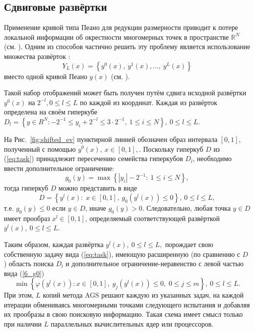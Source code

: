 \subsection{Сдвиговые развёртки}
\label{sec:shifted}

Применение кривой типа Пеано для редукции размерности приводит к потере локальной информации об окрестности многомерных точек
в пространстве $\mathbb{R}^N$ (см. \cite{Strongin1992}).
Одним из способов частично решить эту проблему является использование множества развёрток \cite{Strongin1992}:
\begin{equation}%
Y_L(x)=\left\{y^0(x),\ y^1(x),...,\ y^L(x)\right\}
\end{equation}
вместо одной кривой Пеано $y(x)$ (см. \cite{Strongin1992,Strongin2000, Strongin1991}).

Такой набор отображений может быть получен путём сдвига исходной развёртки $y^0(x)$ на $2^{-l},0
\leq l \leq L$ по каждой из координат. Каждая из развёрток определена на своём гиперкубе $D_l=
\left\{y \in R^N: -2^{-1} \leq y_i+2^{-l} \leq 3 \cdot 2^{-1},\ 1\leq i\leq N\right\},\ 0 \leq l \leq
L$.

На Рис.~\ref{fig:shifted_ev} пунктирной линией обозначен образ интервала $[0,1]$, полученный с помощью $y^0(x),\
x\in [0,1],$. Поскольку гиперкуб $D$ из (\ref{eq:task}) принадлежит пересечению
семейства гиперкубов $D_l$, необходимо ввести дополнительное ограничение:
\begin{equation}\label{6_g0}
g_0(y)=\max\left\{\left|y_i\right| - 2^{-1}:\ 1\leq i\leq N\right\},
\end{equation}
тогда гиперкуб $D$ можно представить в виде
\[
D=\left\{y^l(x):\; x\in [0,1],\ g_0(y^l(x))\leq 0 \right\},\ 0\leq l \leq L,
\]
т.е. $g_0(y) \leq 0$ если $y\in D$, иначе $g_0(y)>0$. Следовательно, любая точка $y \in D$
имеет прообраз $x^l \in [0,1]$, определяемый соответствующей развёрткой $y^l(x),\ 0\leq l\leq L$.

Таким образом, каждая развёртка $y^l(x),\ 0\leq l \leq L,$ порождает свою собственную задачу вида
(\ref{eq:task}), имеющую расширенную (по сравнению с $D$) область поиска $D_l$
и дополнительное ограничение-неравенство с левой частью вида (\ref{6_g0})
\begin{equation}\label{6_problem_l}
\min{\left\{\varphi(y^l(x)):x\in [0,1], \; g_j(y^l(x))\leq 0, \; 0 \leq j \leq m\right\}}, \ 0 \leq l \leq L.
\end{equation}
При этом, $L$ копий метода AGS решают каждую из указанных задач, на каждой итерации обмениваясь многомерными точками
следующего испытания и добавляя их прообразы в свою поисковую информацию. Такая схема имеет смысл только при
наличии $L$ параллельных вычислительных ядер или процессоров.

